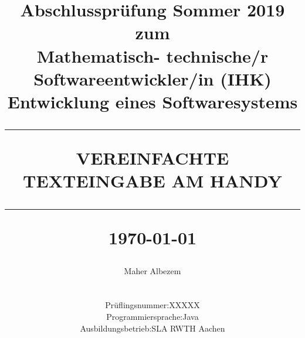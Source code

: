 \documentclass[11pt, a4paper, titlepage]{book}
\begin{document}
\sloppy



\frontmatter

\title{
  \Large Abschlussprüfung Sommer 2019 zum\\\textbf{Mathematisch- technische/r Softwareentwickler/in (IHK)}\\ [2.0cm]
    \Large Entwicklung eines Softwaresystems\\ [2.5cm]
	\hrule
	\LARGE \textbf{\uppercase{Vereinfachte Texteingabe am Handy}} \\ [1.0cm]
	\hrule
	\normalsize \today \vspace*{0.5\baselineskip}
}
\date{}
\author{
  Maher Albezem \\ \\
  \begin{tabular}{l l@{}l l}
   Prüflingsnummer &:&& XXXXX \\
   Programmiersprache &:&& Java \\
   Ausbildungsbetrieb &:&& SLA RWTH Aachen\\
  \end{tabular} \\ \\
}

\maketitle
%


%

\makeatletter
{}
\makeatother
\tableofcontents
\end{document}
